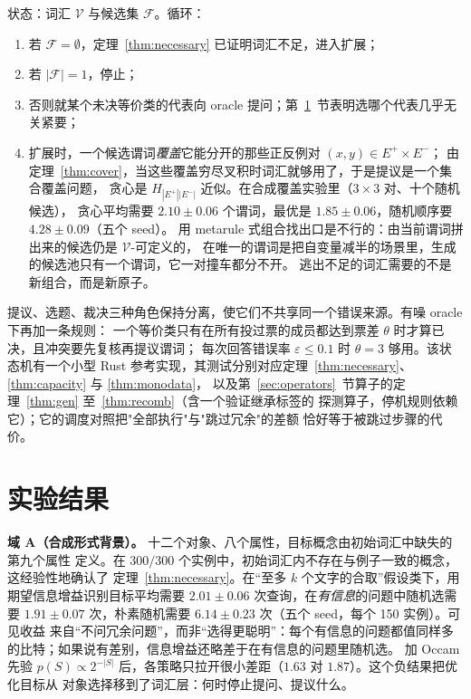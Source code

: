 \documentclass[11pt]{ctexart}
\newcommand{\Vocab}{\mathcal{V}}
\newcommand{\Epos}{E^{+}}
\newcommand{\Eneg}{E^{-}}
\begin{document}
状态：词汇 $\Vocab$ 与候选集 $\mathcal{F}$。循环：
\begin{enumerate}
  \item 若 $\mathcal{F} = \emptyset$，定理~\ref{thm:necessary} 已证明词汇不足，进入扩展；
  \item 若 $|\mathcal{F}| = 1$，停止；
  \item 否则就某个未决等价类的代表向 oracle 提问；第~\ref{sec:experiments}~节表明选哪个代表几乎无关紧要；
  \item 扩展时，一个候选谓词\emph{覆盖}它能分开的那些正反例对 $(x,y) \in \Epos \times \Eneg$；
        由定理~\ref{thm:cover}，当这些覆盖穷尽叉积时词汇就够用了，于是提议是一个集合覆盖问题，
        贪心是 $H_{|\Epos||\Eneg|}$ 近似。在合成覆盖实验里（$3\times3$ 对、十个随机候选），
        贪心平均需要 $2.10 \pm 0.06$ 个谓词，最优是 $1.85 \pm 0.06$，随机顺序要 $4.28 \pm 0.09$（五个 seed）。
        用 metarule 式组合找出口是不行的：由当前谓词拼出来的候选仍是 $\Vocab$-可定义的，
        在唯一的谓词是把自变量减半的场景里，生成的候选池只有一个谓词，它一对撞车都分不开。
        逃出不足的词汇需要的不是新组合，而是新原子。
\end{enumerate}
提议、选题、裁决三种角色保持分离，使它们不共享同一个错误来源。有噪 oracle 下再加一条规则：
一个等价类只有在所有投过票的成员都达到票差 $\theta$ 时才算已决，且冲突要先复核再提议谓词；
每次回答错误率 $\varepsilon \le 0.1$ 时 $\theta = 3$ 够用。该状态机有一个小型 Rust
参考实现，其测试分别对应定理~\ref{thm:necessary}、\ref{thm:capacity} 与 \ref{thm:monodata}，
以及第~\ref{sec:operators}~节算子的定理~\ref{thm:gen} 至~\ref{thm:recomb}（含一个验证继承标签的
探测算子，停机规则依赖它）；它的调度对照把"全部执行"与"跳过冗余"的差额
恰好等于被跳过步骤的代价。

\section{实验结果}\label{sec:experiments}

\textbf{域 A（合成形式背景）。} 十二个对象、八个属性，目标概念由初始词汇中缺失的第九个属性
定义。在 $300/300$ 个实例中，初始词汇内不存在与例子一致的概念，这经验性地确认了
定理~\ref{thm:necessary}。在“至多 $k$ 个文字的合取”假设类下，用期望信息增益识别目标平均需要
$2.01 \pm 0.06$ 次查询，在\emph{有信息}的问题中随机选需要 $1.91 \pm 0.07$ 次，朴素随机需要
$6.14 \pm 0.23$ 次（五个 seed，每个 150 实例）。可见收益
来自“不问冗余问题”，而非“选得更聪明”：每个有信息的问题都值同样多的比特；如果说有差别，信息增益还略差于在有信息的问题里随机选。
加 Occam 先验 \cite{grunwald2019}
$p(S)\propto 2^{-|S|}$ 后，各策略只拉开很小差距（$1.63$ 对 $1.87$）。这个负结果把优化目标从
对象选择移到了词汇层：何时停止提问、提议什么。
\end{document}
